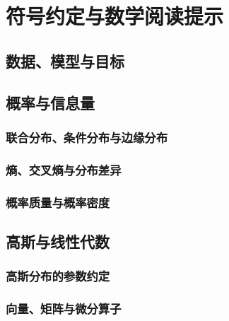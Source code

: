 \chapter{符号约定与数学阅读提示}
\label{chap:notation}

\section{数据、模型与目标}
\label{sec:notation-data}
\contentplaceholder

\section{概率与信息量}
\label{sec:notation-probability}
\contentplaceholder

\subsection{联合分布、条件分布与边缘分布}
\label{subsec:notation-distributions}
\contentplaceholder

\subsection{熵、交叉熵与分布差异}
\label{subsec:notation-divergences}
\contentplaceholder

\subsection{概率质量与概率密度}
\label{subsec:notation-mass-density}
\contentplaceholder

\section{高斯与线性代数}
\label{sec:notation-linear-algebra}
\contentplaceholder

\subsection{高斯分布的参数约定}
\label{subsec:notation-gaussian}
\contentplaceholder

\subsection{向量、矩阵与微分算子}
\label{subsec:notation-operators}
\contentplaceholder

